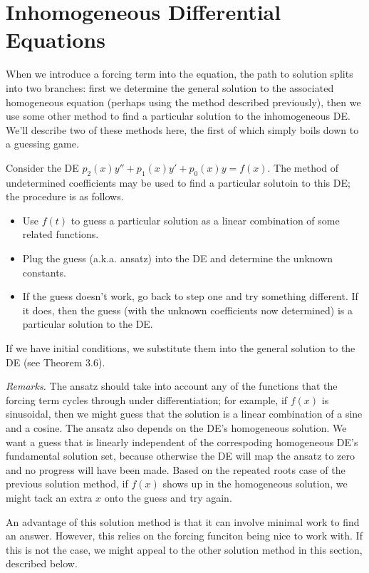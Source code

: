 \documentclass[../m082main.tex]{subfiles}
\begin{document}
\section{Inhomogeneous Differential Equations}
When we introduce a forcing term into the equation, the path to solution splits into two branches: first we determine the general solution to the associated homogeneous equation (perhaps using the method described previously), then we use some other method to find a particular solution to the inhomogeneous DE.
We'll describe two of these methods here, the first of which simply boils down to a guessing game.

\begin{definition}
    Consider the DE $p_2(x)y'' + p_1(x)y' + p_0(x)y = f(x)$.
    The method of undetermined coefficients may be used to find a particular solutoin to this DE; the procedure is as follows.
    \begin{itemize}
        \item Use $f(t)$ to guess a particular solution as a linear combination of some related functions.
        \item Plug the guess (a.k.a. ansatz) into the DE and determine the unknown constants.
        \item If the guess doesn't work, go back to step one and try something different.
        If it does, then the guess (with the unknown coefficients now determined) is a particular solution to the DE.
    \end{itemize}
    If we have initial conditions, we substitute them into the general solution to the DE (see Theorem 3.6).
\end{definition}

\textit{Remarks.}
The ansatz should take into account any of the functions that the forcing term cycles through under differentiation; for example, if $f(x)$ is sinusoidal, then we might guess that the solution is a linear combination of a sine and a cosine.
The ansatz also depends on the DE's homogeneous solution.
We want a guess that is linearly independent of the correspoding homogeneous DE's fundamental solution set, because otherwise the DE will map the ansatz to zero and no progress will have been made.
Based on the repeated roots case of the previous solution method, if $f(x)$ shows up in the homogeneous solution, we might tack an extra $x$ onto the guess and try again.

An advantage of this solution method is that it can involve minimal work to find an answer.
However, this relies on the forcing funciton being nice to work with.
If this is not the case, we might appeal to the other solution method in this section, described below.
\end{document}
